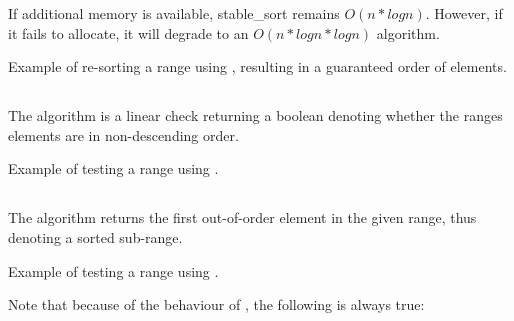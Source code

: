If additional memory is available, stable\_sort remains $O(n*logn)$. However, if it fails to allocate, it will degrade to an $O(n*logn*logn)$ algorithm.

\begin{box-note}
\footnotesize Example of re-sorting a range using , resulting in a guaranteed order of elements.
\tcblower
{}
\end{box-note}

\subsection{\texorpdfstring{}{\texttt{std::is\_sorted}}}

The  algorithm is a linear check returning a boolean denoting whether the ranges elements are in non-descending order.


\begin{box-note}
\footnotesize Example of testing a range using .
\tcblower
{}
\end{box-note}

\subsection{\texorpdfstring{}{\texttt{std::is\_sorted\_until}}}

The  algorithm returns the first out-of-order element in the given range, thus denoting a sorted sub-range.


\begin{box-note}
\footnotesize Example of testing a range using .
\tcblower
{}
\end{box-note}

Note that because of the behaviour of , the following is always true:\\
\small{}

